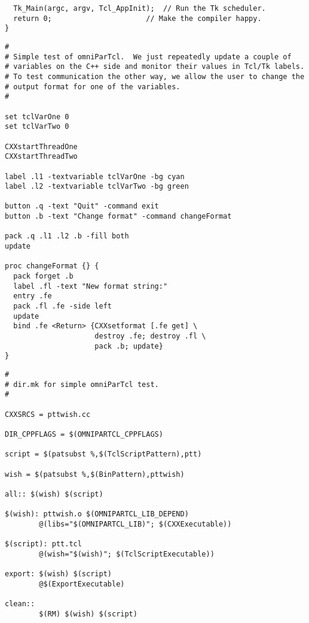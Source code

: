 \documentclass[11pt]{article}
\begin{document}
\begin{verbatim}
  Tk_Main(argc, argv, Tcl_AppInit);  // Run the Tk scheduler.
  return 0;	                     // Make the compiler happy.
}
\end{verbatim}


\newpage
\begin{verbatim}
#
# Simple test of omniParTcl.  We just repeatedly update a couple of 
# variables on the C++ side and monitor their values in Tcl/Tk labels.
# To test communication the other way, we allow the user to change the
# output format for one of the variables.
#

set tclVarOne 0
set tclVarTwo 0

CXXstartThreadOne
CXXstartThreadTwo

label .l1 -textvariable tclVarOne -bg cyan
label .l2 -textvariable tclVarTwo -bg green

button .q -text "Quit" -command exit
button .b -text "Change format" -command changeFormat

pack .q .l1 .l2 .b -fill both
update

proc changeFormat {} {
  pack forget .b  
  label .fl -text "New format string:"
  entry .fe 
  pack .fl .fe -side left
  update
  bind .fe <Return> {CXXsetformat [.fe get] \
                     destroy .fe; destroy .fl \
                     pack .b; update}
}
\end{verbatim}


\newpage
\begin{verbatim}
#
# dir.mk for simple omniParTcl test.
#

CXXSRCS = pttwish.cc

DIR_CPPFLAGS = $(OMNIPARTCL_CPPFLAGS)

script = $(patsubst %,$(TclScriptPattern),ptt)

wish = $(patsubst %,$(BinPattern),pttwish)

all:: $(wish) $(script)

$(wish): pttwish.o $(OMNIPARTCL_LIB_DEPEND)
        @(libs="$(OMNIPARTCL_LIB)"; $(CXXExecutable))

$(script): ptt.tcl
        @(wish="$(wish)"; $(TclScriptExecutable))

export: $(wish) $(script)
        @$(ExportExecutable)

clean::
        $(RM) $(wish) $(script)
\end{verbatim}
\end{document}
